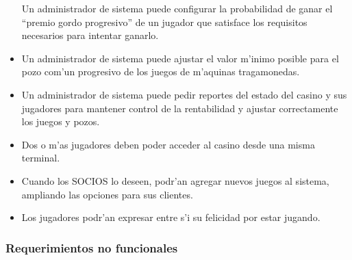 \begin{itemize}
 Un administrador de sistema puede configurar la probabilidad de ganar el ``premio gordo progresivo'' de un jugador que satisface los requisitos necesarios para intentar ganarlo.

\item {}

 Un administrador de sistema puede ajustar el valor m'inimo posible para el pozo com'un progresivo de los juegos de m'aquinas tragamonedas.

\item {} 

 Un administrador de sistema puede pedir reportes del estado del casino y sus jugadores para mantener control de la rentabilidad y ajustar correctamente los juegos y pozos.

\item {}

 Dos o m'as jugadores deben poder acceder al casino desde una misma terminal.

\item {} 

 Cuando los SOCIOS lo deseen, podr'an agregar nuevos juegos al sistema, ampliando las opciones para sus clientes.

\end{itemize}

\clearpage


\begin{itemize}

\item {} 

 Los jugadores podr'an expresar entre s'i su felicidad por estar jugando.

\end{itemize}



\subsubsection{Requerimientos no funcionales}

